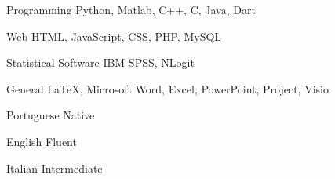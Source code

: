 

\begin{cvskills}

  \cvskill
    {Programming} %
    {Python, Matlab, C++, C, Java, Dart} %

  \cvskill
    {Web} %
    {HTML, JavaScript, CSS, PHP, MySQL} %
    
  \cvskill
    {Statistical Software} %
    {IBM SPSS, NLogit} %
 
  \cvskill
    {General} %
    {\LaTeX, Microsoft Word, Excel, PowerPoint, Project, Visio} %
    
\end{cvskills}


\begin{cvskills}

  \cvskill
    {Portuguese} %
    {Native} %

  \cvskill
    {English} %
    {Fluent} %
    
  \cvskill
    {Italian} %
    {Intermediate} %
    
\end{cvskills}